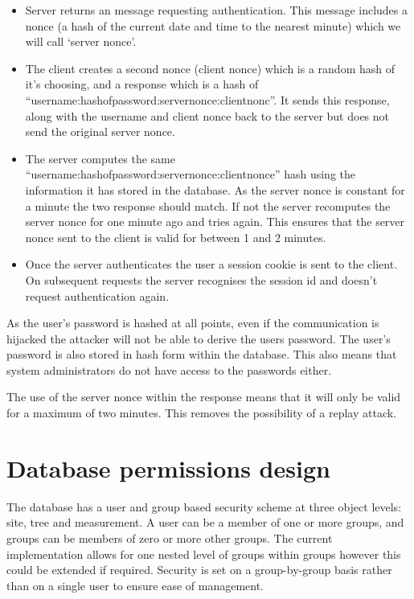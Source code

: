 \begin{itemize}
 \item Server returns an message requesting authentication. This message includes a nonce (a hash of the current date and time to the nearest minute) which we will call `server nonce'.
 \item The client creates a second nonce (client nonce) which is a random hash of it's choosing, and a response which is a hash of ``username:hashofpassword:servernonce:clientnonc''. It sends this response, along with the username and client nonce back to the server but does not send the original server nonce.
 \item The server computes the same ``username:hashofpassword:servernonce:clientnonce'' hash using the information it has stored in the database. As the server nonce is constant for a minute the two response should match. If not the server recomputes the server nonce for one minute ago and tries again. This ensures that the server nonce sent to the client is valid for between 1 and 2 minutes.
 \item Once the server authenticates the user a session cookie is sent to the client. On subsequent requests the server recognises the session id and doesn't request authentication again. 
\end{itemize}

As the user's password is hashed at all points, even if the communication is hijacked the attacker will not be able to derive the users password. The user's password is also stored in hash form within the database. This also means that system administrators do not have access to the passwords either.

The use of the server nonce within the response means that it will only be valid for a maximum of two minutes. This removes the possibility of a replay attack. 


\section{Database permissions design}
The database has a user and group based security scheme at three object levels: site, tree and measurement. A user can be a member of one or more groups, and groups can be members of zero or more other groups. The current implementation allows for one nested level of groups within groups however this could be extended if required. Security is set on a group-by-group basis rather than on a single user to ensure ease of management.

